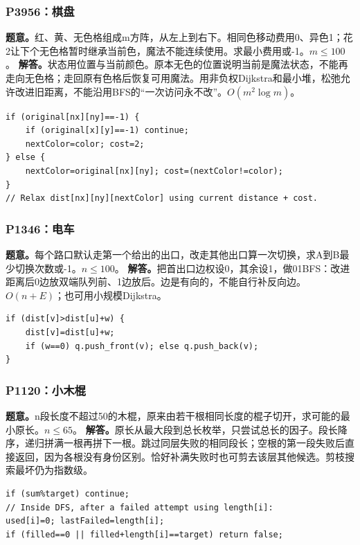 \subsubsection{P3956：棋盘}
\textbf{题意。}红、黄、无色格组成m方阵，从左上到右下。相同色移动费用0、异色1；花2让下个无色格暂时继承当前色，魔法不能连续使用。求最小费用或-1。$m\le100$。
\textbf{解答。}状态用位置与当前颜色。原本无色的位置说明当前是魔法状态，不能再走向无色格；走回原有色格后恢复可用魔法。用非负权Dijkstra和最小堆，松弛允许改进旧距离，不能沿用BFS的“一次访问永不改”。$O(m^2\log m)$。
\begin{lstlisting}
if (original[nx][ny]==-1) {
    if (original[x][y]==-1) continue;
    nextColor=color; cost=2;
} else {
    nextColor=original[nx][ny]; cost=(nextColor!=color);
}
// Relax dist[nx][ny][nextColor] using current distance + cost.
\end{lstlisting}

\subsubsection{P1346：电车}
\textbf{题意。}每个路口默认走第一个给出的出口，改走其他出口算一次切换，求A到B最少切换次数或-1。$n\le100$。
\textbf{解答。}把首出口边权设0，其余设1，做01BFS：改进距离后0边放双端队列前、1边放后。边是有向的，不能自行补反向边。$O(n+E)$；也可用小规模Dijkstra。
\begin{lstlisting}
if (dist[v]>dist[u]+w) {
    dist[v]=dist[u]+w;
    if (w==0) q.push_front(v); else q.push_back(v);
}
\end{lstlisting}

\subsubsection{P1120：小木棍}
\textbf{题意。}n段长度不超过50的木棍，原来由若干根相同长度的棍子切开，求可能的最小原长。$n\le65$。
\textbf{解答。}原长从最大段到总长枚举，只尝试总长的因子。段长降序，递归拼满一根再拼下一根。跳过同层失败的相同段长；空根的第一段失败后直接返回，因为各根没有身份区别。恰好补满失败时也可剪去该层其他候选。剪枝搜索最坏仍为指数级。
\begin{lstlisting}
if (sum%target) continue;
// Inside DFS, after a failed attempt using length[i]:
used[i]=0; lastFailed=length[i];
if (filled==0 || filled+length[i]==target) return false;
\end{lstlisting}

